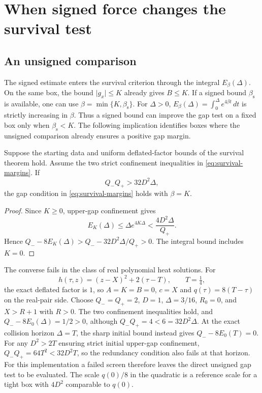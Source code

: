\section{When signed force changes the survival test}
\label{sec:diagnostics}

\subsection{An unsigned comparison}

The signed estimate enters the survival criterion through the
integral \(E_\beta(\Delta)\). On the same box, the bound
\(\lvert g_x\rvert\le K\) already gives \(B\le K\). If a signed bound
\(\beta_{\mathrm s}\) is available, one can use
\(\beta=\min\{K,\beta_{\mathrm s}\}\).
For \(\Delta>0\), \(E_\beta(\Delta)=\int_0^\Delta e^{4\beta t}\,dt\)
is strictly increasing in \(\beta\). Thus a signed bound can improve
the gap test on a fixed box only when \(\beta_{\mathrm s}<K\). The
following implication identifies boxes where the unsigned comparison
already ensures a positive gap margin.

\begin{proposition}
\label{thm:redundancy}
Suppose the starting data and uniform deflated-factor bounds of the
survival theorem hold. Assume the two strict confinement inequalities in
\eqref{eq:survival-margins}. If
\begin{equation}
 Q_-Q_+>32D^2\Delta,
 \label{eq:redundancy-screen}
\end{equation}
the gap condition in \eqref{eq:survival-margins} holds with \(\beta=K\).
\end{proposition}

\begin{proof}
Since \(K\ge0\), upper-gap confinement gives
\[
 E_K(\Delta)\le\Delta e^{4K\Delta}
       <\frac{4D^2\Delta}{Q_+}.
\]
Hence \(Q_--8E_K(\Delta)>Q_- - 32D^2\Delta/Q_+>0\).
The integral bound includes \(K=0\).
\end{proof}

The converse fails in the class of real polynomial heat solutions.
For
\[
 h(\tau,z)=(z-X)^2+2(\tau-T),\qquad T=\tfrac14,
\]
the exact deflated factor is \(1\), so \(A=K=B=0\),
\(c=X\) and \(q(\tau)=8(T-\tau)\) on the real-pair side.
Choose \(Q_-=Q_+=2\), \(D=1\), \(\Delta=3/16\),
\(R_0=0\), and \(X>R+1\) with \(R>0\). The two confinement
inequalities hold, and \(Q_--8E_0(\Delta)=1/2>0\), although
\(Q_-Q_+=4<6=32D^2\Delta\).
At the exact collision horizon \(\Delta=T\), the sharp initial
bound instead gives \(Q_--8E_0(T)=0\). For any \(D^2>2T\)
ensuring strict initial upper-gap confinement,
\(Q_-Q_+=64T^2<32D^2T\), so the redundancy condition
also fails at that horizon. For this implementation a failed screen
therefore leaves the direct unsigned gap test to be evaluated.
The scale \(q(0)/8\) in the quadratic is a reference scale for a
tight box with \(4D^2\) comparable to \(q(0)\).

